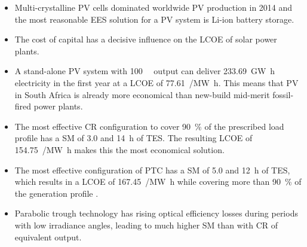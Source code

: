\begin{itemize}
\item Multi-crystalline PV cells dominated worldwide PV production in 2014 and the most reasonable EES solution for a PV system is  Li-ion battery storage.

\item The cost of capital has a decisive influence on the LCOE of solar power plants.


\item A stand-alone PV system with \SI{100}{\mega\wattsac} output can deliver \SI{233.69}{\giga\watt\hour} electricity in the first year at a LCOE of \SI{77.61}{\usd/\mega\watt\hour}. This means that PV in South Africa is already more economical than new-build mid-merit fossil-fired power plants.


\item The most effective CR configuration to cover \SI{90}{\percent} of the prescribed load profile has a SM of \num{3.0} and \SI{14}{\hour} of TES. The resulting LCOE of \SI{154.75}{\usd/\mega\watt\hour} makes this the most economical solution.


\item The most effective configuration of PTC has a SM of \num{5.0} and \SI{12}{\hour} of TES, which results in a LCOE of \SI{167.45}{\usd/\mega\watt\hour} while covering more than \SI{90}{\percent} of the generation profile .

\item Parabolic trough technology has rising optical efficiency losses during periods with low irradiance angles, leading to much higher SM than with CR of equivalent output.


\end{itemize}
